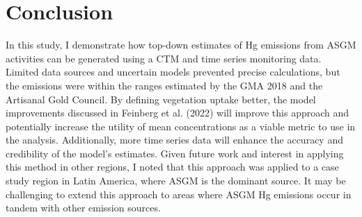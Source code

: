 \section{Conclusion}
\begin{flushleft}
In this study, I demonstrate how top-down estimates of Hg emissions from ASGM activities can be generated using a CTM and time series monitoring data. Limited data sources and uncertain models prevented precise calculations, but the emissions were within the ranges estimated by the GMA 2018\cite{steenhuisen_development_2019,united_nations_environment_programme_technical_2019} and the Artisanal Gold Council\cite{agc_reporte_2017}. By defining vegetation uptake better, the model improvements discussed in Feinberg et al. (2022) will improve this approach and potentially increase the utility of mean concentrations as a viable metric to use in the analysis\cite{feinberg_evaluating_2022}. Additionally, more time series data will enhance the accuracy and credibility of the model's estimates. Given future work and interest in applying this method in other regions, I noted that this approach was applied to a case study region in Latin America, where ASGM is the dominant source. It may be challenging to extend this approach to areas where ASGM Hg emissions occur in tandem with other emission sources.
 
\end{flushleft}
